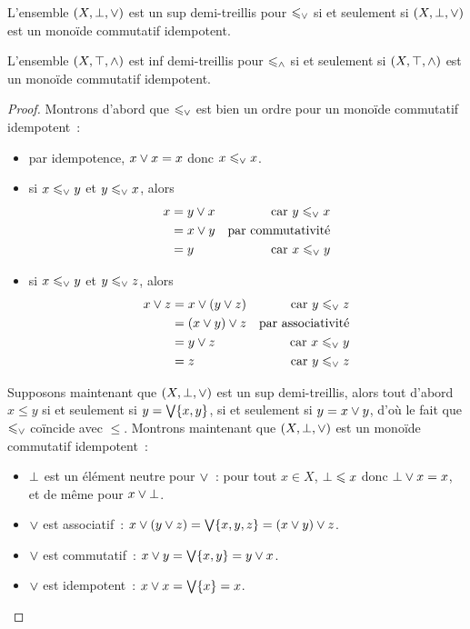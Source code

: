 \begin{proposition}
  L'ensemble $(X,\bot,\vee)$ est un sup demi-treillis pour $\leqslant_{\vee}$ si et
  seulement si $(X,\bot,\mathord{\vee})$ est un monoïde commutatif idempotent.

  L'ensemble $(X,\top,\wedge)$ est inf demi-treillis pour $\leqslant_{\wedge}$ si et
  seulement si $(X,\top,\mathord{\wedge})$ est un monoïde commutatif idempotent.
\end{proposition}

\begin{proof}
  Montrons d'abord que $\leqslant_{\vee}$ est bien un ordre pour un monoïde
  commutatif idempotent~:
  \begin{itemize}
  \item par idempotence, $x\vee x = x$ donc $x\leqslant_{\vee} x$.
  \item si $x\leqslant_{\vee} y$ et $y\leqslant_{\vee} x$, alors 
    \begin{align*}
      x &= y \vee x &\text{car } y \leqslant_{\vee} x\\
      &= x \vee y &\text{par commutativité}\\
      &= y & \text{car } x \leqslant_{\vee} y
    \end{align*}
  \item si $x\leqslant_{\vee} y$ et $y\leqslant_{\vee} z$, alors
    \begin{align*}
      x\vee z &= x \vee (y \vee z) &\text{car } y \leqslant_{\vee} z\\
      &= (x \vee y) \vee z &\text{par associativité}\\
      &= y \vee z &\text{car } x \leqslant_{\vee} y\\
      &= z &\text{car } y \leqslant_{\vee} z
    \end{align*}
  \end{itemize}

  Supposons maintenant que $(X,\bot,\vee)$ est un sup demi-treillis, alors tout
  d'abord $x\leq y$ si et seulement si $y = \bigvee\{x,y\}$, si et seulement si
  $y = x \vee y$, d'où le fait que $\leqslant_{\vee}$ coïncide avec $\leq$. Montrons
  maintenant que $(X,\bot,\vee)$ est un monoïde commutatif idempotent~:
  \begin{itemize}
  \item $\bot$ est un élément neutre pour $\vee$~: pour tout $x\in X$,
    $\bot\leqslant x$ donc $\bot \vee x = x$, et de même pour $x\vee\bot$.
  \item $\vee$ est associatif~:
    $x\vee (y \vee z) = \bigvee\{x,y,z\} = (x\vee y)\vee z$.
  \item $\vee$ est commutatif~: $x\vee y = \bigvee\{x,y\}=y\vee x$.
  \item $\vee$ est idempotent~: $x\vee x = \bigvee\{x\}=x$.
  \end{itemize}


\end{proof}
